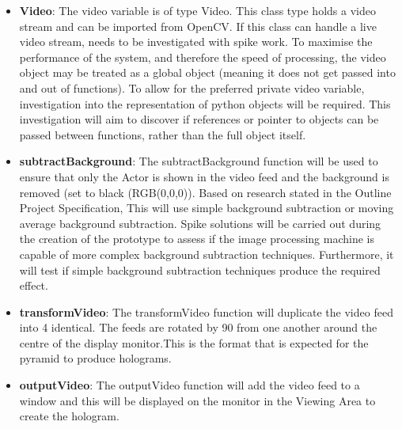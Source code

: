 \documentclass{article}
\begin{document}
\begin{itemize}

	\item \textbf{Video}: The video variable is of type Video. This class type holds a video stream and can be imported from OpenCV. If this class can handle a live video stream, needs to be investigated with spike work. To maximise the performance of the system, and therefore the speed of processing, the video object may be treated as a global object (meaning it does not get passed into and out of functions). To allow for the preferred private video variable, investigation into the representation of python objects will be required. This investigation will aim to discover if references or pointer to objects can be passed between functions, rather than the full object itself.

	\item \textbf{subtractBackground}: The subtractBackground function will be used to ensure that only the Actor is shown in the video feed and the background is removed (set to black (RGB(0,0,0)). Based on research stated in the Outline Project Specification, This will use simple background subtraction or moving average background subtraction. Spike solutions will be carried out during the creation of the prototype to assess if the image processing machine is capable of more complex background subtraction techniques. Furthermore, it will test if simple background subtraction techniques produce the required effect.

	\item \textbf{transformVideo}: The transformVideo function will duplicate the video feed into 4 identical. The feeds are rotated by 90 from one another around the centre of the display monitor.This is the format that is expected for the pyramid to produce holograms.

	\item \textbf{outputVideo}: The outputVideo function will add the video feed to a window and this will be displayed on the monitor in the Viewing Area to create the hologram.

\end{itemize}
\end{document}
